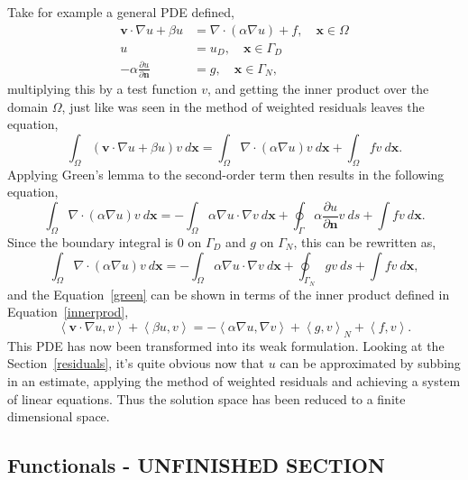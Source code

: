Take for example a general PDE defined,
\begin{align}
	\mathbf{v}\cdot\nabla u + \beta u &= \nabla\cdot(\alpha\nabla u) + f,\quad  \mathbf{x} \in \Omega \\
	u &= u_D,\quad \mathbf{x} \in \Gamma_D\\
	-\alpha\frac{\partial u}{\partial \mathbf{n}} &= g,\quad \mathbf{x} \in \Gamma_N,
\end{align}
multiplying this by a test function $v$, and getting the inner product over the domain $\Omega$, just like was seen in the method of weighted residuals leaves the equation,
\begin{equation}\label{green}
		\int_{\Omega}(\mathbf{v}\cdot\nabla u + \beta u)v~d\mathbf{x} = \int_{\Omega}\nabla\cdot(\alpha\nabla u)v~d\mathbf{x} + \int_{\Omega}fv~d\mathbf{x}.
\end{equation}
Applying Green's lemma to the second-order term then results in the following equation,
\begin{equation}
	\int_{\Omega}\nabla\cdot(\alpha\nabla u)v~d\mathbf{x} = -\int_{\Omega}\alpha\nabla u\cdot \nabla v~d\mathbf{x} + \oint_{\Gamma} \alpha \frac{\partial u}{\partial \mathbf{n}} v~ds + \int fv~d\mathbf{x}.
\end{equation}
Since the boundary integral is $0$ on $\Gamma_D$ and $g$ on $\Gamma_N$, this can be rewritten as,
\begin{equation}
	\int_{\Omega}\nabla\cdot(\alpha\nabla u)v~d\mathbf{x} = -\int_{\Omega}\alpha\nabla u\cdot \nabla v~d\mathbf{x} + \oint_{\Gamma_N} gv~ds + \int fv~d\mathbf{x},
\end{equation}
and the Equation~\eqref{green} can be shown in terms of the inner product defined in Equation~\eqref{innerprod},
\begin{equation}\label{weak}
	\left\langle\mathbf{v}\cdot\nabla u,v\right\rangle + \left\langle\beta u,v\right\rangle = -\left\langle\alpha\nabla u, \nabla v\right\rangle + \left\langle g,v\right\rangle_N + \left\langle f,v\right\rangle.
\end{equation}
This PDE has now been transformed into its weak formulation. Looking at the Section~\ref{residuals}, it's quite obvious now that $u$ can be approximated by subbing in an estimate, applying the method of weighted residuals and achieving a system of linear equations. Thus the solution space has been reduced to a finite dimensional space.

\subsection{Functionals - UNFINISHED SECTION}\label{functionals}

